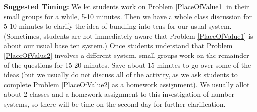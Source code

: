 \documentclass[nooutcomes]{ximera}
\begin{document}
\begin{instructorNotes}
{\bf Suggested Timing:} We let students work on Problem \ref{PlaceOfValue1} in their small groups for a while, 5-10 minutes.  Then we have a whole class discussion for 5-10 minutes to clarify the idea of bundling into tens for our usual system. (Sometimes, students are not immediately aware that Problem \ref{PlaceOfValue1} is about our usual base ten system.) Once students understand that Problem \ref{PlaceOfValue2} involves a different system, small groups work on the remainder of the questions for 15-20 minutes.  Save about 15 minutes to go over some of the ideas (but we usually do not discuss all of the activity, as we ask students to complete Problem \ref{PlaceOfValue2} as a homework assignment).  We usually allot about 2 classes and a homework assignment to this investigation of number systems, so there will be time on the second day for further clarification.

\end{instructorNotes}
\end{document}
